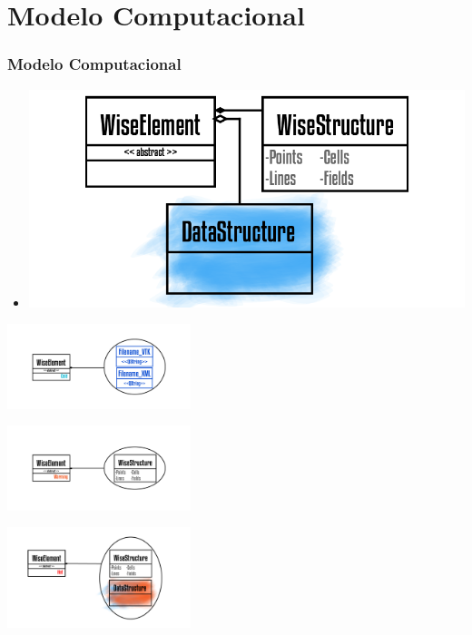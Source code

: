 \documentclass[10pt]{beamer}
\theoremstyle{remark}
\theoremstyle{definition}
\begin{document}
\section{Modelo Computacional}
\begin{frame}[allowframebreaks]
	\frametitle{Modelo Computacional}
	
	\begin{itemize}
		
		\item \includegraphics[width=1\textwidth]{images/Prancheta 2_2@4x.png}
		
	\end{itemize}

	\framebreak
	
	\begin{flushleft}
	\includegraphics[width=0.4\textwidth]{images/Prancheta 8@4x.png}
	\end{flushleft}
	\begin{center}
	\item \includegraphics[width=0.4\textwidth]{images/Prancheta 9@4x.png}
	\end{center}
	\begin{flushright}
	\includegraphics[width=0.4\textwidth]{images/Prancheta 10@4x.png}
	\end{flushright}


\end{frame}
\end{document}
